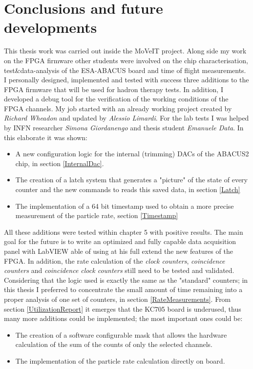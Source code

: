 \chapter*{Conclusions and future developments}
\noindent This thesis work was carried out inside the MoVeIT project.
Along side my work on the FPGA firmware other students were involved on the chip characterisation, test\&data-analysis of the ESA-ABACUS board and time of flight measurements.
I personally designed, implemented and tested with success three additions to the FPGA firmware that will be used for hadron therapy tests.
In addition, I developed a debug tool for the verification of the working conditions of the FPGA channels.
My job started with an already working project created by \textit{Richard Wheadon} and updated by \textit{Alessio Limardi}.
For the lab tests I was helped by INFN researcher \textit{Simona Giordanengo} and thesis student \textit{Emanuele Data}.
In this elaborate it was shown:
\begin{itemize}
	\item A new configuration logic for the internal (trimming) DACs of the ABACUS2 chip, in section \ref{InternalDac}.
	\item The creation of a latch system that generates a "picture" of the state of every counter and the new commands to reads this saved data, in section \ref{Latch}
	\item The implementation of a 64 bit timestamp used to obtain a more precise measurement of the particle rate, section \ref{Timestamp}
\end{itemize}
\noindent All these additions were tested within chapter 5 with positive results.
The main goal for the future is to write an optimized and fully capable data acquisition panel with LabVIEW able of using at his full extend the new features of the FPGA.
In addition, the rate calculation of the \textit{clock counters}, \textit{coincidence counters} and \textit{coincidence clock counters} still need to be tested and validated. Considering that the logic used is exactly the same as the "standard" counters; in this thesis I preferred to concentrate the small amount of time remaining into a proper analysis of one set of counters, in section \ref{RateMeasurements}.
From section \ref{UtilizationReport} it emerges that the KC705 board is underused, thus many more additions could be implemented; the most important ones could be:
\begin{itemize}
	\item The creation of a software configurable mask that allows the hardware calculation of the sum of the counts of only the selected channels.  
	\item The implementation of the particle rate calculation directly on board.
\end{itemize}


